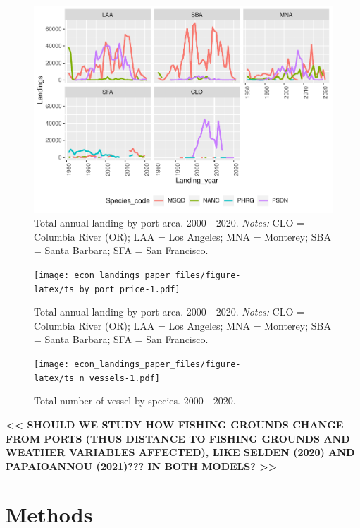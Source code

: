 \documentclass[
]{article}
\begin{document}
\begin{figure}
\centering
\includegraphics{econ_landings_paper_files/figure-latex/ts_by_port-1.pdf}
\caption{Total annual landing by port area. 2000 - 2020. \textit{Notes:}
CLO = Columbia River (OR); LAA = Los Angeles; MNA = Monterey; SBA =
Santa Barbara; SFA = San Francisco.\label{fig:ts_landings_by_ports}}
\end{figure}

\begin{figure}
\centering
\texttt{[image: econ\_landings\_paper\_files/figure-latex/ts\_by\_port\_price-1.pdf]}
\caption{Total annual landing by port area. 2000 - 2020. \textit{Notes:}
CLO = Columbia River (OR); LAA = Los Angeles; MNA = Monterey; SBA =
Santa Barbara; SFA = San Francisco.\label{fig:ts_price_by_ports}}
\end{figure}

\begin{figure}
\centering
\texttt{[image: econ\_landings\_paper\_files/figure-latex/ts\_n\_vessels-1.pdf]}
\caption{Total number of vessel by species. 2000 -
2020.\label{fig:ts_n_vessels}}
\end{figure}

\textbf{\textless\textless{} SHOULD WE STUDY HOW FISHING GROUNDS CHANGE
FROM PORTS (THUS DISTANCE TO FISHING GROUNDS AND WEATHER VARIABLES
AFFECTED), LIKE SELDEN (2020) AND PAPAIOANNOU (2021)??? IN BOTH MODELS?
\textgreater\textgreater{}}

\hypertarget{methods}{%
\section{Methods}\label{methods}}
\end{document}
